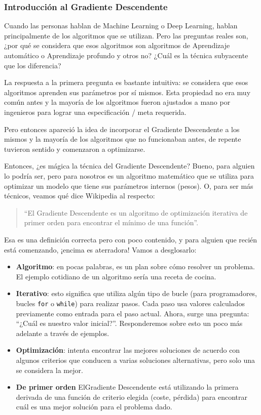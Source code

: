\documentclass[
]{book}
\providecommand{\tightlist}{%
  \setlength{\itemsep}{0pt}\setlength{\parskip}{0pt}}
\begin{document}
\hypertarget{introducciuxf3n-al-gradiente-descendente}{%
\subsubsection{Introducción al Gradiente Descendente}\label{introducciuxf3n-al-gradiente-descendente}}

Cuando las personas hablan de Machine Learning o Deep Learning, hablan principalmente de los algoritmos que se utilizan. Pero las preguntas reales son, ¿por qué se considera que esos algoritmos son algoritmos de Aprendizaje automático o Aprendizaje profundo y otros no? ¿Cuál es la técnica subyacente que los diferencia?

La respuesta a la primera pregunta es bastante intuitiva: se considera que esos algoritmos aprenden sus parámetros por sí mismos. Esta propiedad no era muy común antes y la mayoría de los algoritmos fueron ajustados a mano por ingenieros para lograr una especificación / meta requerida.

Pero entonces apareció la idea de incorporar el Gradiente Descendente a los mismos y la mayoría de los algoritmos que no funcionaban antes, de repente tuvieron sentido y comenzaron a optimizarse.

Entonces, ¿es mágica la técnica del Gradiente Descendente? Bueno, para alguien lo podría ser, pero para nosotros es un algoritmo matemático que se utiliza para optimizar un modelo que tiene sus parámetros internos (pesos). O, para ser más técnicos, veamos qué dice Wikipedia al respecto:

\begin{quote}
``El Gradiente Descendente es un algoritmo de optimización iterativa de primer orden para encontrar el mínimo de una función''.
\end{quote}

Esa es una definición correcta pero con poco contenido, y para alguien que recién está comenzando, ¡encima es aterradora! Vamos a desglosarlo:

\begin{itemize}
\tightlist
\item
  \textbf{Algoritmo}: en pocas palabras, es un plan sobre cómo resolver un problema. El ejemplo cotidiano de un algoritmo sería una receta de cocina.
\item
  \textbf{Iterativo}: esto significa que utiliza algún tipo de bucle (para programadores, bucles \texttt{for} o \texttt{while}) para realizar pasos. Cada paso usa valores calculados previamente como entrada para el paso actual. Ahora, surge una pregunta: ``¿Cuál es nuestro valor inicial?''. Responderemos sobre esto un poco más adelante a través de ejemplos.
\item
  \textbf{Optimización}: intenta encontrar las mejores soluciones de acuerdo con algunos criterios que conducen a varias soluciones alternativas, pero solo una se considera la mejor.
\item
  \textbf{De primer orden} ElGradiente Descendente está utilizando la primera derivada de una función de criterio elegida (coste, pérdida) para encontrar cuál es una mejor solución para el problema dado.
\end{itemize}
\end{document}
